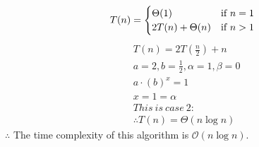 \documentclass[12pt,letterpaper]{article}
\begin{document}
\begin{enumerate}
\begin{equation}
   T(n)=
   \begin{cases}
   \Theta(1) & \mbox{if $n = 1$}\\
   2 T(n) + \Theta(n) &\mbox{if $ n > 1$}\\
   \end{cases}
  \end{equation}
\begin{align*}
& T(n) = 2T(\frac{n}{2}) + n \\
& a = 2, b = \frac{1}{2}, \alpha = 1, \beta = 0 \\
& a \cdot (b) ^ x = 1 \\
& x = 1 = \alpha \\
& This \  is\  case \ 2: \\
& \therefore T(n) = \Theta(n \log n)
\end{align*}
$\therefore$ The time complexity of this algorithm is $\mathcal{O}(n \log n)$.
\end{enumerate}
\end{document}
